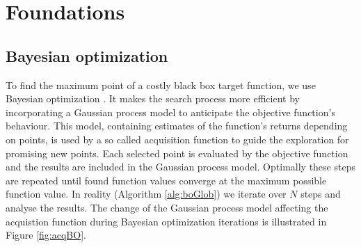 \chapter{Foundations}
\label{chap:2}

\section{Bayesian optimization}


To find the maximum point of a costly black box target function, we use Bayesian optimization \cite{brochu2010tutorial,shahriari2016taking,lizotte2008practical}. It makes the search process more efficient by incorporating a Gaussian process model to anticipate the objective function's behaviour. This model, containing estimates of the function's returns depending on points, is used by a so called acquisition function to guide the exploration for promising new points. Each selected point is evaluated by the objective function and the results are included in the Gaussian process model. Optimally these steps are repeated until found function values converge at the maximum possible function value. In reality (Algorithm \ref{alg:boGlob}) we iterate over $N$ steps and analyse the results. The change of the Gaussian process model affecting the acquistion function during Bayesian optimization iterations is illustrated in Figure \ref{fig:acqBO}.\\

